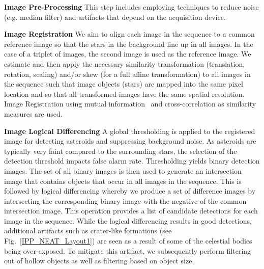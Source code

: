 \documentclass{article}
\begin{document}
{\bf Image Pre-Processing}
This step includes employing techniques to reduce noise (e.g. median filter) and artifacts that depend on the acquisition device.   %

{\bf Image Registration}
We aim to align each image in the sequence to a common reference image so that the stars in the background line up in all images.  In the case of a triplet of images, the second image is used as the reference image.  We estimate and then apply the necessary similarity transformation (translation, rotation, scaling) and/or skew (for a full affine transformation) to all images in the sequence such that image objects (stars) are mapped into the same pixel location and so that all transformed images have the same spatial resolution.  Image Registration using mutual information~\cite{viola1997alignment} and cross-correlation as similarity measures are used. 

{\bf Image Logical Differencing}
A global thresholding is applied to the registered image for detecting asteroids and suppressing background noise.  As asteroids are typically very faint compared to the surrounding stars, the selection of the detection threshold impacts false alarm rate.  Thresholding yields binary detection images.  The set of all binary images is then used to generate an intersection image that contains objects that occur in all images in the sequence.  This is followed by logical differencing whereby we produce a set of difference images by intersecting the corresponding binary image with the negative of the common intersection image.  This operation provides a list of candidate detections for each image in the sequence.  While the logical differencing results in good detections, additional artifacts such as crater-like formations (see Fig.~\ref{IPP_NEAT_Layout1}) are seen as a result of some of the celestial bodies being over-exposed.  To mitigate this artifact, we subsequently perform filtering out of hollow objects as well as filtering based on object size.
\end{document}
